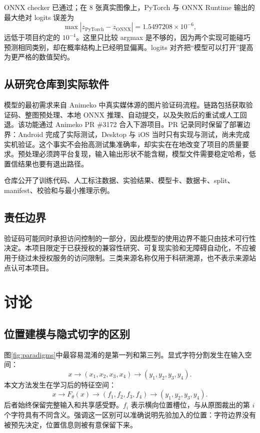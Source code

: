 \documentclass[UTF8,12pt,a4paper]{ctexart}
\begin{document}
ONNX checker 已通过；在 8 张真实图像上，PyTorch 与 ONNX Runtime 输出的最大绝对 logits 误差为
\begin{equation}
  \max|z_{\mathrm{PyTorch}}-z_{\mathrm{ONNX}}|
  =1.5497208\times10^{-6},
\end{equation}
远低于项目约定的 $10^{-4}$。这里只比较 argmax 是不够的，因为两个实现可能碰巧预测相同类别，却在概率结构上已经明显偏离。logits 对齐把“模型可以打开”提高为更严格的数值契约。

\subsection{从研究仓库到实际软件}

模型的最初需求来自 Animeko 中真实媒体源的图片验证码流程。链路包括获取验证码、整图预处理、本地 ONNX 推理、自动提交，以及失败后的重试或人工回退。该功能通过 Animeko PR \#3172 合入下游项目\cite{animeko2026pr}。PR 记录同时保留了部署边界：Android 完成了实际测试，Desktop 与 iOS 当时只有实现与测试，尚未完成实机验证。这个事实不会抬高测试集准确率，却实实在在地改变了项目的质量要求。预处理必须跨平台复现，输入输出形状不能含糊，模型文件需要稳定哈希，低置信结果也要有退出路径。

仓库公开了训练代码、人工标注数据、实验结果、模型卡、数据卡、split、manifest、校验和与最小推理示例\cite{cnnforani2026repo}。
\subsection{责任边界}

验证码可能同时承担访问控制的一部分，因此模型的使用边界不能只由技术可行性决定。本项目限定于已获授权的兼容性研究、可复现实验和无障碍自动化，不应被用于绕过未授权服务的访问限制。三类来源名称仅用于科研溯源，也不表示来源站点认可本项目。

\section{讨论}

\subsection{位置建模与隐式切字的区别}

图\ref{fig:paradigms}中最容易混淆的是第一列和第三列。显式字符分割发生在输入空间：
\begin{equation}
  x\rightarrow(x_1,x_2,x_3,x_4)
  \rightarrow(y_1,y_2,y_3,y_4).
\end{equation}
本文方法发生在学习后的特征空间：
\begin{equation}
  x\rightarrow F_\theta(x)
  \rightarrow(f_1,f_2,f_3,f_4)
  \rightarrow(y_1,y_2,y_3,y_4).
\end{equation}
后者始终保留完整输入和共享感受野。$f_i$ 表示横向位置槽位，与从原图裁出的第 $i$ 个字符具有不同含义。强调这一区别可以准确说明先验加入的位置：字符边界没有被预先决定，位置信息则被有意保留下来。
\end{document}
